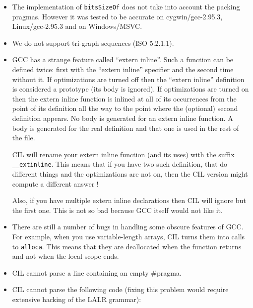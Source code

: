 \documentclass{article}
\def\t#1{{\tt #1}}
\begin{document}
\begin{itemize}

\item The implementation of \t{bitsSizeOf} does not take into account the
packing pragmas. However it was tested to be accurate on cygwin/gcc-2.95.3,
Linux/gcc-2.95.3 and on Windows/MSVC.

\item We do not support tri-graph sequences (ISO 5.2.1.1).

\item GCC has a strange feature called ``extern inline''. Such a function can
be defined twice: first with the ``extern inline'' specifier and the second
time without it. If optimizations are turned off then the ``extern inline''
definition is considered a prototype (its body is ignored). If optimizations
are turned on then the extern inline function is inlined at all of its
occurrences from the point of its definition all the way to the point where the
(optional) second definition appears. No body is generated for an extern
inline function. A body is generated for the real definition and that one is
used in the rest of the file. 

 CIL will rename your extern inline function (and its uses) with the suffix
 \t{\_\_extinline}. This means that if you have two such definition, that do
 different things and the optimizations are not on, then the CIL version might
 compute a different answer !

 Also, if you have multiple extern inline declarations then CIL will ignore
but the first one. This is not so bad because GCC itself would not like it. 

\item There are still a number of bugs in handling some obscure features of
GCC. For example, when you use variable-length arrays, CIL turns them into
calls to \t{alloca}. This means that they are deallocated when the function
returns and not when the local scope ends. 

\item CIL cannot parse a line containing an empty #pragma.

\item CIL cannot parse the following code (fixing this problem would require
extensive hacking of the LALR grammar):


\end{itemize}
\end{document}
